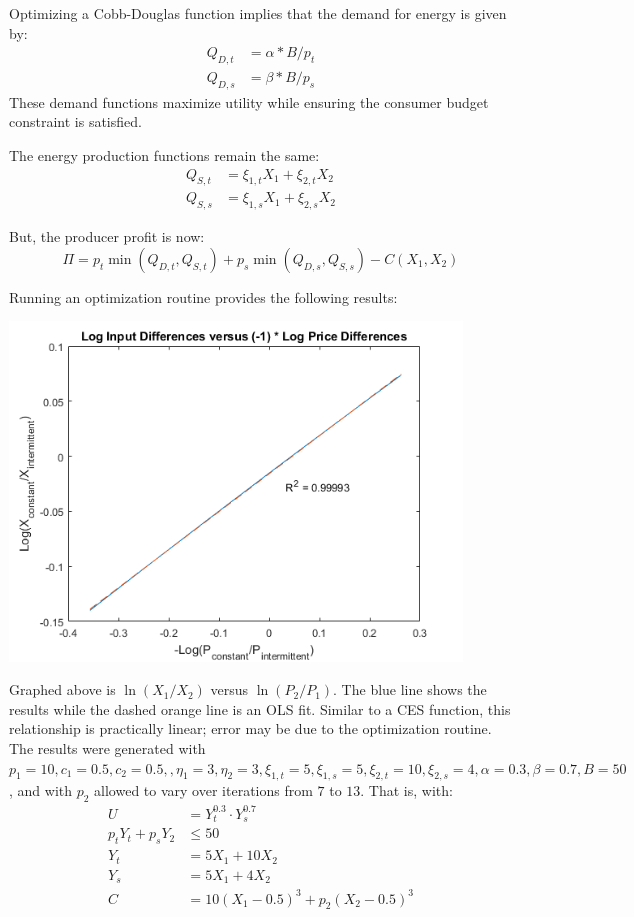 \documentclass[12pt,a4paper]{extarticle}
\begin{document}
Optimizing a Cobb-Douglas function implies that the demand for energy is given by:
\begin{align*}
Q_{D, t} &= \alpha*B / p_t \\
Q_{D, s} &= \beta*B / p_s
\end{align*}
These demand functions maximize utility while ensuring the consumer budget constraint is satisfied. 

The energy production functions remain the same:
\begin{align*}
Q_{S, t} &= \xi_{1,t} X_1 + \xi_{2,t} X_2 \\
Q_{S, s} &= \xi_{1,s} X_1 + \xi_{2,s} X_2
\end{align*}

But, the producer profit is now:
$$\Pi = p_t \min(Q_{D,t}, Q_{S,t}) + p_s \min(Q_{D,s}, Q_{S,s}) - C(X_1, X_2)$$

Running an optimization routine provides the following results:

\begin{center}
	\includegraphics[width=0.9\textwidth]{exhibits/model_v1_ex.png} 
\end{center}

Graphed above is $\ln(X_1/ X_2)$ versus $\ln(P_2/P_1)$. The blue line shows the results while the dashed orange line is an OLS fit. Similar to a CES function, this relationship is practically linear; error may be due to the optimization routine. The results were generated with $p_1 = 10, c_1 = 0.5, c_2 = 0.5, , \eta_1 = 3, \eta_2 = 3, \xi_{1,t} = 5, \xi_{1,s} = 5, \xi_{2,t} = 10, \xi_{2,s}  = 4, \alpha = 0.3, \beta = 0.7, B = 50$, and with $p_2$ allowed to vary over iterations from $7$ to $13$. That is, with:
\begin{align*}
U &= Y_t^{0.3} \cdot Y_s^{0.7} \\
p_t Y_t + p_s Y_2 &\leq 50 \\
Y_t &= 5 X_1 + 10 X_2 \\
Y_s &= 5 X_1 + 4 X_2 \\
C &= 10 (X_1 - 0.5)^{3} + p_2 (X_2 - 0.5)^{3}
\end{align*}
\end{document}
